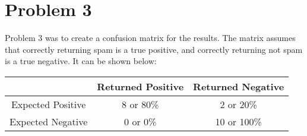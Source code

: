 \documentclass[11pt]{report}
\begin{document}
\section{Problem 3}
Problem 3 was to create a confusion matrix for the results. The matrix assumes that correctly returning spam is a true positive, and correctly returning not spam is a true negative. It can be shown below:

\begin{tabular}{|c|c|c|}
\hline
& Returned Positive & Returned Negative\\\hline
Expected Positive & 8 or 80\% & 2 or 20\% \\\hline

Expected Negative & 0 or 0\% & 10 or 100\%\\\hline

\end{tabular}
\end{document}
